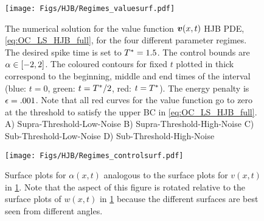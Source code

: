 \begin{figure}[h!]
\begin{center}
\texttt{[image: Figs/HJB/Regimes\_valuesurf.pdf]}
\caption[Value Function numerical solution]
{The numerical solution for the value function ${ \boldsymbol{v} }(x,t)$ HJB PDE,
\cref{eq:OC_LS_HJB_full}, for the four different parameter regimes.
The desired spike time is set to ${ T^* }=1.5$.
The control bounds are $\alpha \in [-2,2]$. 
The coloured contours for fixed $t$ plotted in thick correspond to the
beginning, middle and end times of the interval (blue: $t=0$, green:
$t={ T^* }/2$, red: $t={ T^* }$).
The energy penalty is ${\epsilon} = .001$. 
Note that all red curves for the value function go to zero at the threshold to
satisfy the upper BC in \cref{eq:OC_LS_HJB_full}.
\\
A) Supra-Threshold-Low-Noise
B) Supra-Threshold-High-Noise
C) Sub-Threshold-Low-Noise 
D) Sub-Threshold-High-Noise  }
\label{fig:HJB_4regimes_value_surf}
\end{center}
\end{figure}
\begin{figure}[htp]
\begin{center}
  \texttt{[image: Figs/HJB/Regimes\_controlsurf.pdf]}
  \caption[Closed-loop Optimal Control corresponding to Value Function]
  {Surface
  plots for $\alpha(x,t)$ analogous to the surface plots for $v(x,t)$ in \cref{fig:HJB_4regimes_value_surf}. 
Note that the aspect of this figure is rotated
relative to the surface plots of $w(x,t)$ in \cref{fig:HJB_4regimes_value_surf}
because the different surfaces are best seen from different angles.}
  \label{fig:HJB__4regimes_control_surf}
\end{center}
\end{figure}    

